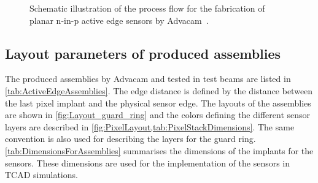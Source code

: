 \begin{figure}[htbp]
\begin{subfigure}[b]{0.3\textwidth}
    \caption{}
  \end{subfigure}

  \caption{Schematic illustration of the process flow for the
    fabrication of planar n-in-p active edge sensors by
    Advacam~\cite{AdvacamRef}.}
  \label{fig:AdvacamProcessFlow}
\end{figure}


\newpage
\subsection{Layout parameters of produced assemblies}
\label{sec:AEgeometry}

The produced assemblies by Advacam and tested in test beams are listed
in \cref{tab:ActiveEdgeAssemblies}. The edge distance is defined by the
distance between the last pixel implant and the physical sensor
edge. The layouts of the assemblies are shown in
\cref{fig:Layout_guard_ring} and the colors defining the different
sensor layers are described in
\cref{fig:PixelLayout,tab:PixelStackDimensions}. The same convention
is also used for describing the layers for the guard
ring. \cref{tab:DimensionsForAssemblies} summarises the dimensions of
the implants for the sensors. These dimensions are used for the
implementation of the sensors in TCAD simulations.



